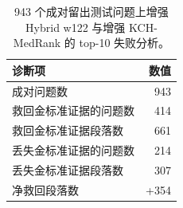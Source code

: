 \begin{table}[t]
\centering
\small
\caption{943 个成对留出测试问题上增强 Hybrid w122 与增强 KCH-MedRank 的 top-10 失败分析。}
\label{tab:failure-analysis-summary}
\begin{tabular}{lr}
\toprule
诊断项 & 数值 \\
\midrule
成对问题数 & 943 \\
救回金标准证据的问题数 & 414 \\
救回金标准证据段落数 & 661 \\
丢失金标准证据的问题数 & 214 \\
丢失金标准证据段落数 & 307 \\
净救回段落数 & +354 \\
\bottomrule
\end{tabular}
\end{table}

